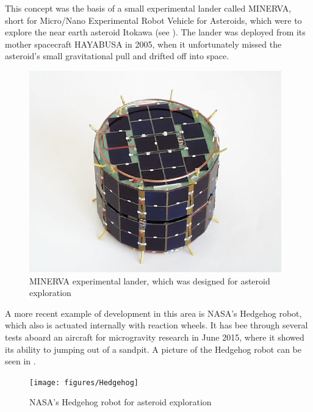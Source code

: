 This concept was the basis of a small experimental lander called MINERVA, short for Micro/Nano Experimental Robot Vehicle for Asteroids, which were to explore the near earth asteroid Itokawa (see ). The lander was deployed from its mother spacecraft HAYABUSA in 2005, when it unfortunately missed the asteroid's small gravitational pull and drifted off into space. \cite{TYoshimitsu}
%
\begin{figure}[H] 
	\centering
	\includegraphics[scale=.8]{figures/MINERVA}
	\caption{MINERVA experimental lander, which was designed for asteroid exploration \cite{TYoshimitsu}}
	\label{MINERVA}
\end{figure}
%
A more recent example of development in this area is NASA's Hedgehog robot, which also is actuated internally with reaction wheels. It has bee through several tests aboard an aircraft for microgravity research in June 2015, where it showed its ability to jumping out of a sandpit. A picture of the Hedgehog robot can be seen in . \cite{ELandau}
%
\begin{figure}[H] 
	\centering
	\texttt{[image: figures/Hedgehog]}
	\caption{NASA's Hedgehog robot for asteroid exploration \cite{ELandau}}
	\label{Hedgehog}
\end{figure}